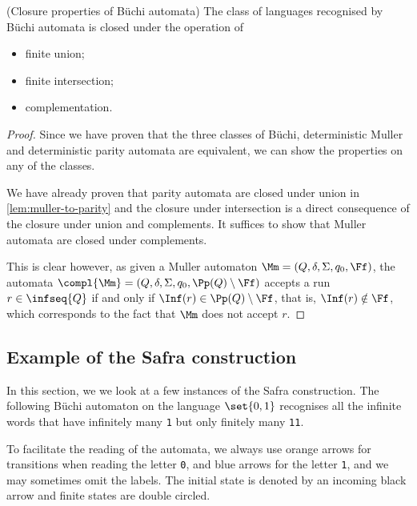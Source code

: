 \begin{theorem}(Closure properties of Büchi automata)
    \label{thm:closure-of-buchi}
    The class of languages recognised by Büchi automata
    is closed under the operation of \begin{itemize}
        \item finite union;
        \item finite intersection;
        \item complementation.
    \end{itemize}
\end{theorem}
\begin{proof}
    Since we have proven that the three classes of Büchi,
    deterministic Muller and deterministic parity automata
    are equivalent, we can show the properties on any of the classes.

    We have already proven that parity automata are closed
    under union in \autoref{lem:muller-to-parity}
    and the closure under intersection
    is a direct consequence of the closure under union and complements.
    It suffices to show that Muller automata are closed under complements.

    This is clear however, as given a Muller automaton $\Mm = (Q, \delta, \Sigma, q_0, \Ff)$,
    the automata $\compl{\Mm} = (Q, \delta, \Sigma, q_0, \Pp(Q) \setminus \Ff)$
    accepts a run $r \in \infseq{Q}$ if and only if $\Inf(r) \in \Pp(Q) \setminus \Ff$, that is,
    $\Inf(r) \notin \Ff$, which corresponds to the fact that $\Mm$ does not accept $r$.
\end{proof}

\subsection{Example of the Safra construction}\label{sec:safra-examples}

In this section, we we look at a few instances of the Safra construction.
The following Büchi automaton on the language $\set{0, 1}$ recognises
all the infinite words that have infinitely many \verb|1| but only finitely many \verb|11|.

\begin{center}
    
\end{center}

To facilitate the reading of the automata, we always use orange arrows for
transitions when reading the letter \verb|0|, and blue arrows for the letter \verb|1|,
and we may sometimes omit the labels. The initial state is denoted by
an incoming black arrow and finite states are double circled.

